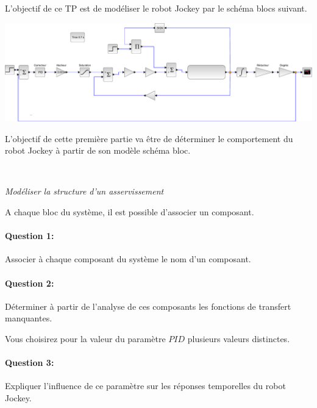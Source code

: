 

\ifdef{\public}{\cleardoublepage}{}



L'objectif de ce TP est de modéliser le robot Jockey par le schéma blocs suivant.

\begin{center}
 \includegraphics[width=0.95\linewidth]{img/jockey}
\end{center}

L'objectif de cette première partie va être de déterminer le comportement du robot Jockey à partir de son modèle schéma bloc.

~\

\textit{Modéliser la structure d'un asservissement}

A chaque bloc du système, il est possible d'associer un composant.

\paragraph{Question 1:} Associer à chaque composant du système le nom d'un composant.

\paragraph{Question 2:} Déterminer à partir de l'analyse de ces composants les fonctions de transfert manquantes.

Vous choisirez pour la valeur du paramètre $PID$ plusieurs valeurs distinctes.

\paragraph{Question 3:} Expliquer l'influence de ce paramètre sur les réponses temporelles du robot Jockey.

\ifdef{\public}{\cleardoublepage}{}

